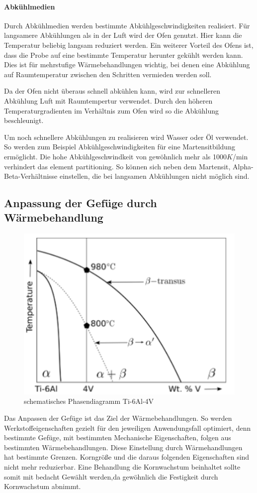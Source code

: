 \documentclass[a4paper, 11pt]{tubsreprt}
\begin{document}
\paragraph{Abkühlmedien}

Durch Abkühlmedien werden bestimmte Abkühlgeschwindigkeiten realisiert. Für langsamere Abkühlungen als in der Luft wird der Ofen genutzt. Hier kann die Temperatur beliebig langsam reduziert werden. Ein weiterer Vorteil des Ofens ist, dass die Probe auf eine bestimmte Temperatur herunter gekühlt werden kann. Dies ist für mehrstufige Wärmebehandlungen wichtig, bei denen eine Abkühlung auf Raumtemperatur zwischen den Schritten vermieden werden soll. 

Da der Ofen nicht überaus schnell abkühlen kann, wird zur schnelleren Abkühlung Luft mit Raumtempertur verwendet. Durch den höheren Temperaturgradienten im Verhältnis zum Ofen wird so die Abkühlung beschleunigt.  

Um noch schnellere Abkühlungen zu realisieren wird Wasser oder Öl verwendet. So werden zum Beispiel Abkühlgeschwindigkeiten für eine Martensitbildung ermöglicht. Die hohe Abkühlgeschwindkeit von gewöhnlich mehr als 1000$K$/min verhindert das element partitioning. So können sich neben dem Martensit, Alpha-Beta-Verhältnisse einstellen, die bei langsamen Abkühlungen nicht möglich sind. 
\subsection{Anpassung der Gefüge durch Wärmebehandlung}
\begin{figure}
	\centering
	\includegraphics[scale=0.9]{Bilder/Phasendiagram.PNG}
	\caption[Phasendiagramm]{schematisches Phasendiagramm Ti-6Al-4V \cite{Babu2008}}
	\label{fig2}
\end{figure}
Das Anpassen der Gefüge ist das Ziel der Wärmebehandlungen. So werden Werkstoffeigenschaften gezielt für den jeweiligen Anwendungsfall optimiert, denn bestimmte Gefüge, mit bestimmten Mechanische Eigenschaften,  folgen aus bestimmten Wärmebehandlungen. Diese Einstellung durch Wärmehandlungen hat bestimmte Grenzen. Korngröße und die daraus folgenden Eigenschaften sind nicht mehr reduzierbar. Eine Behandlung die Kornwachstum beinhaltet sollte somit mit bedacht Gewählt werden,da gewöhnlich die Festigkeit durch Kornwachstum abnimmt.
\end{document}
